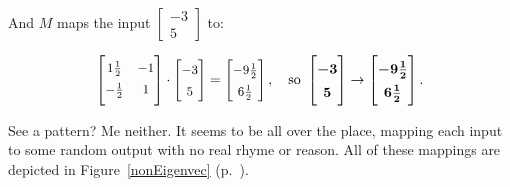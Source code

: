 And $M$ maps the input {\footnotesize $\begin{bmatrix} -3 \\ 5 \end{bmatrix}$} to:

\vspace{-.2in}
\begin{align*}
\renewcommand*{\arraystretch}{1.4}
\small
\begin{bmatrix}
1\frac{1}{2} & -1 \\
\smallskip
-\frac{1}{2} & 1 \\
\end{bmatrix} \cdot
\begin{bmatrix}
-3 \\ 5 \\
\end{bmatrix} =
\begin{bmatrix}
-9\frac{1}{2} \\ 6\frac{1}{2} \\
\end{bmatrix}, \normalsize \quad \textrm{so}\
\boldmath
\begin{bmatrix}
-3 \\ 5 \\
\end{bmatrix} \rightarrow
\begin{bmatrix}
-9\frac{1}{2} \\ 6\frac{1}{2} \\
\end{bmatrix}.
\unboldmath
\end{align*}

See a pattern? Me neither. It seems to be all over the place, mapping each
input to some random output with no real rhyme or reason. All of these mappings
are depicted in Figure~\ref{nonEigenvec} (p.~\pageref{nonEigenvec}).

